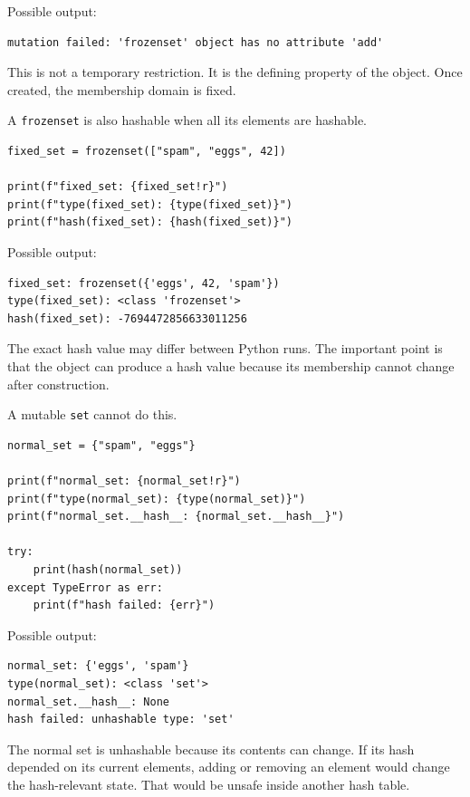 Possible output:

\begin{verbatim}
mutation failed: 'frozenset' object has no attribute 'add'
\end{verbatim}

This is not a temporary restriction. It is the defining property of the object. Once created, the membership domain is fixed.

A \texttt{frozenset} is also hashable when all its elements are hashable.

\begin{verbatim}
fixed_set = frozenset(["spam", "eggs", 42])

print(f"fixed_set: {fixed_set!r}")
print(f"type(fixed_set): {type(fixed_set)}")
print(f"hash(fixed_set): {hash(fixed_set)}")
\end{verbatim}

Possible output:

\begin{verbatim}
fixed_set: frozenset({'eggs', 42, 'spam'})
type(fixed_set): <class 'frozenset'>
hash(fixed_set): -7694472856633011256
\end{verbatim}

The exact hash value may differ between Python runs. The important point is that the object can produce a hash value because its membership cannot change after construction.

A mutable \texttt{set} cannot do this.

\begin{verbatim}
normal_set = {"spam", "eggs"}

print(f"normal_set: {normal_set!r}")
print(f"type(normal_set): {type(normal_set)}")
print(f"normal_set.__hash__: {normal_set.__hash__}")

try:
    print(hash(normal_set))
except TypeError as err:
    print(f"hash failed: {err}")
\end{verbatim}

Possible output:

\begin{verbatim}
normal_set: {'eggs', 'spam'}
type(normal_set): <class 'set'>
normal_set.__hash__: None
hash failed: unhashable type: 'set'
\end{verbatim}

The normal set is unhashable because its contents can change. If its hash depended on its current elements, adding or removing an element would change the hash-relevant state. That would be unsafe inside another hash table.

